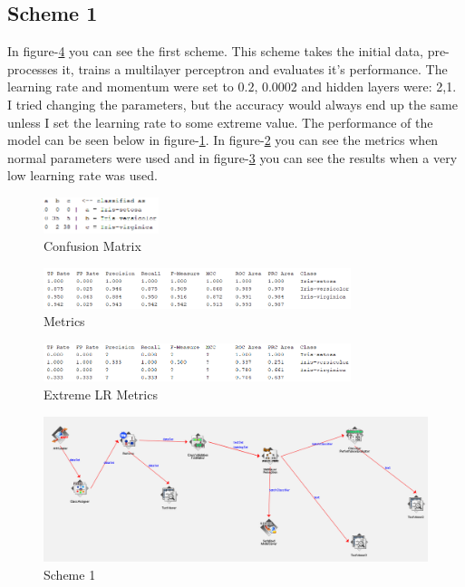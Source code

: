 \documentclass{article}
\begin{document}
\subsection*{Scheme 1}
In figure-\ref{fig:scheme-1} you can see the first scheme. This scheme takes the initial data, pre-processes it, trains a multilayer perceptron and evaluates it's performance. The learning rate and momentum were set to $0.2$, $0.0002$ and hidden layers were: 2,1. I tried changing the parameters, but the accuracy would always end up the same unless I set the learning rate to some extreme value. The performance of the model can be seen below in figure-\ref{fig:confusion}. In figure-\ref{fig:normal} you can see the metrics when normal parameters were used and in figure-\ref{fig:extreme} you can see the results when a very low learning rate was used.
\begin{figure}[H]
    \centering
    \includegraphics[width=0.3\textwidth]{confusion.png}
    \caption{Confusion Matrix}
    \label{fig:confusion}
\end{figure}
\begin{figure}[H]
    \centering
    \includegraphics[width=0.8\textwidth]{normal-results.png}
    \caption{Metrics}
    \label{fig:normal}
\end{figure}
\begin{figure}[H]
    \centering
    \includegraphics[width=0.8\textwidth]{extreme-results.png}
    \caption{Extreme LR Metrics}
    \label{fig:extreme}
\end{figure}
\begin{figure}[H]
    \centering
    \includegraphics[width=1\textwidth]{config-1.png}
    \caption{Scheme 1}
    \label{fig:scheme-1}
\end{figure}
\end{document}
